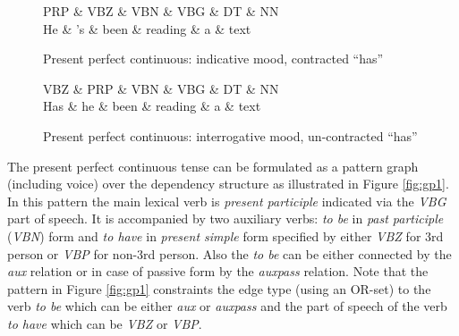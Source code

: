 	\begin{figure}[!ht]
        \centering
		\begin{dependency}
			\begin{deptext}[]
				PRP \& VBZ \& VBN \& VBG \& DT \& NN \\
				He \& 's \& been \& reading \& a \& text \\
			\end{deptext}
		\end{dependency}
		\caption{Present perfect continuous: indicative mood, contracted ``has'' }
		\label{fig:ppc2}
	\end{figure}
%
\begin{figure}[!ht]
	\centering
	\begin{dependency}
		\begin{deptext}[]
			VBZ \& PRP \& VBN \& VBG \& DT \& NN \\
			Has \& he \& been \& reading \& a \& text \\
		\end{deptext}
	\end{dependency}
	\caption{Present perfect continuous: interrogative mood, un-contracted ``has''}
	\label{fig:ppc3}
\end{figure}


The present perfect continuous tense can be formulated as a pattern graph (including voice) over the dependency structure as illustrated in Figure \ref{fig:gp1}.
In this pattern the main lexical verb is \textit{present participle} indicated via the \textit{VBG} part of speech. It is accompanied by two auxiliary verbs: \textit{to be} in \textit{past participle} (\textit{VBN}) form and \textit{to have} in \textit{present simple} form specified by either \textit{VBZ} for 3rd person or \textit{VBP} for non-3rd person. Also the \textit{to be} can be either connected by the \textit{aux} relation or in case of passive form by the \textit{auxpass} relation. Note that the pattern in Figure \ref{fig:gp1} constraints the edge type (using an OR-set) to the verb \textit{to be} which can be either \textit{aux} or \textit{auxpass} and the part of speech of the verb \textit{to have} which can be \textit{VBZ} or \textit{VBP}.


